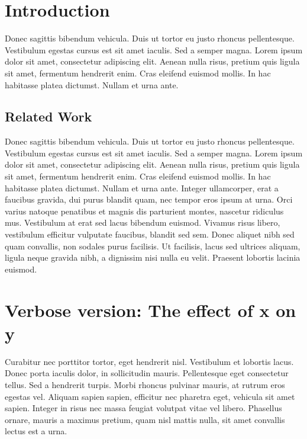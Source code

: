 \documentclass{brandeis-thesis3.2}
\begin{document}
\doublespacing

\tableofcontents
\clearpage

\listoftables
{}
\clearpage

\listoffigures
{}
\clearpage

\startbody

\chapter[Introduction]{Introduction}
Donec sagittis bibendum vehicula. Duis ut tortor eu justo rhoncus pellentesque. Vestibulum egestas cursus est sit amet iaculis. Sed a semper magna. Lorem ipsum dolor sit amet, consectetur adipiscing elit. Aenean nulla risus, pretium quis ligula sit amet, fermentum hendrerit enim. Cras eleifend euismod mollis. In hac habitasse platea dictumst. Nullam et urna ante.

\section{Related Work}
Donec sagittis bibendum vehicula. Duis ut tortor eu justo rhoncus pellentesque. Vestibulum egestas cursus est sit amet iaculis. Sed a semper magna. Lorem ipsum dolor sit amet, consectetur adipiscing elit. Aenean nulla risus, pretium quis ligula sit amet, fermentum hendrerit enim. Cras eleifend euismod mollis. In hac habitasse platea dictumst. Nullam et urna ante. Integer ullamcorper, erat a faucibus gravida, dui purus blandit quam, nec tempor eros ipsum at urna. Orci varius natoque penatibus et magnis dis parturient montes, nascetur ridiculus mus. Vestibulum at erat sed lacus bibendum euismod. Vivamus risus libero, vestibulum efficitur vulputate faucibus, blandit sed sem. Donec aliquet nibh sed quam convallis, non sodales purus facilisis. Ut facilisis, lacus sed ultrices aliquam, ligula neque gravida nibh, a dignissim nisi nulla eu velit. Praesent lobortis lacinia euismod.

\chapter[short-version]{Verbose version: The effect of x on y}

Curabitur nec porttitor tortor, eget hendrerit nisl. Vestibulum et lobortis lacus. Donec porta iaculis dolor, in sollicitudin mauris. Pellentesque eget consectetur tellus. Sed a hendrerit turpis. Morbi rhoncus pulvinar mauris, at rutrum eros egestas vel. Aliquam sapien sapien, efficitur nec pharetra eget, vehicula sit amet sapien. Integer in risus nec massa feugiat volutpat vitae vel libero. Phasellus ornare, mauris a maximus pretium, quam nisl mattis nulla, sit amet convallis lectus est a urna.
\end{document}
